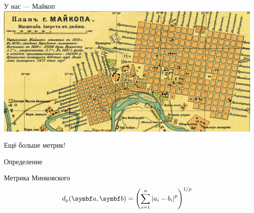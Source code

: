 \begin{frame}{У нас — Майкоп}
\includegraphics[scale=0.5]{figures/video_010_maykop.png}


    

\end{frame}





\begin{frame}{Ещё больше метрик!}

\begin{block}{Определение} 

\alert{Метрика Минковского}
  \[
      d_p(\ba, \bb) = \left(\sum_{i=1}^n \abs{a_i - b_i}^p \right)^{1/p}
  \]
\end{block}
\end{frame}

